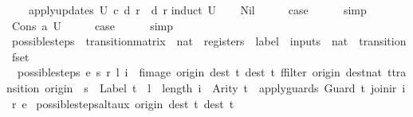 \begin{isabellebody}
\ \ \ \ apply{\isacharunderscore}updates\ U\ c\ d\ r\ {\isacharequal}\ d\ r{\isachardoublequoteclose}\isanewline
%
\isadelimproof
%
\endisadelimproof
%
\isatagproof
{}\isamarkupfalse%
{\isacharparenleft}induct\ U{\isacharparenright}\isanewline
\ \ \isamarkupfalse%
\ Nil\isanewline
\ \ \isamarkupfalse%
\ \isamarkupfalse%
\ {\isacharquery}case\isanewline
\ \ \ \ \isamarkupfalse%
\ simp\isanewline
{}\isamarkupfalse%
\isanewline
\ \ \isamarkupfalse%
\ {\isacharparenleft}Cons\ a\ U{\isacharparenright}\isanewline
\ \ \isamarkupfalse%
\ \isamarkupfalse%
\ {\isacharquery}case\isanewline
\ \ \ \ \isamarkupfalse%
\ simp\isanewline
{}\isamarkupfalse%
%
\endisatagproof
{\isafoldproof}%
%
\isadelimproof
\isanewline
%
\endisadelimproof
\isanewline
{}\isamarkupfalse%
\ possible{\isacharunderscore}steps\ {\isacharcolon}{\isacharcolon}\ {\isachardoublequoteopen}transition{\isacharunderscore}matrix\ {\isasymRightarrow}\ nat\ {\isasymRightarrow}\ registers\ {\isasymRightarrow}\ label\ {\isasymRightarrow}\ inputs\ {\isasymRightarrow}\ {\isacharparenleft}nat\ {\isasymtimes}\ transition{\isacharparenright}\ fset{\isachardoublequoteclose}\ \isanewline
\ \ {\isachardoublequoteopen}possible{\isacharunderscore}steps\ e\ s\ r\ l\ i\ {\isacharequal}\ fimage\ {\isacharparenleft}{\isasymlambda}{\isacharparenleft}{\isacharparenleft}origin{\isacharcomma}\ dest{\isacharparenright}{\isacharcomma}\ t{\isacharparenright}{\isachardot}\ {\isacharparenleft}dest{\isacharcomma}\ t{\isacharparenright}{\isacharparenright}\ {\isacharparenleft}ffilter\ {\isacharparenleft}{\isasymlambda}{\isacharparenleft}{\isacharparenleft}origin{\isacharcomma}\ dest{\isacharcolon}{\isacharcolon}nat{\isacharparenright}{\isacharcomma}\ t{\isacharcolon}{\isacharcolon}transition{\isacharparenright}{\isachardot}\ origin\ {\isacharequal}\ s\ {\isasymand}\ {\isacharparenleft}Label\ t{\isacharparenright}\ {\isacharequal}\ l\ {\isasymand}\ {\isacharparenleft}length\ i{\isacharparenright}\ {\isacharequal}\ {\isacharparenleft}Arity\ t{\isacharparenright}\ {\isasymand}\ apply{\isacharunderscore}guards\ {\isacharparenleft}Guard\ t{\isacharparenright}\ {\isacharparenleft}join{\isacharunderscore}ir\ i\ r{\isacharparenright}{\isacharparenright}\ e{\isacharparenright}{\isachardoublequoteclose}\isanewline
\isanewline
{}\isamarkupfalse%
\ possible{\isacharunderscore}steps{\isacharunderscore}alt{\isacharunderscore}aux{\isacharcolon}\ {\isachardoublequoteopen}{\isacharparenleft}{\isasymlambda}{\isacharparenleft}{\isacharparenleft}origin{\isacharcomma}\ dest{\isacharparenright}{\isacharcomma}\ t{\isacharparenright}{\isachardot}\ {\isacharparenleft}dest{\isacharcomma}\ t{\isacharparenright}{\isacharparenright}\ {\isacharbar}{\isacharbackquote}{\isacharbar}\isanewline

\end{isabellebody}
